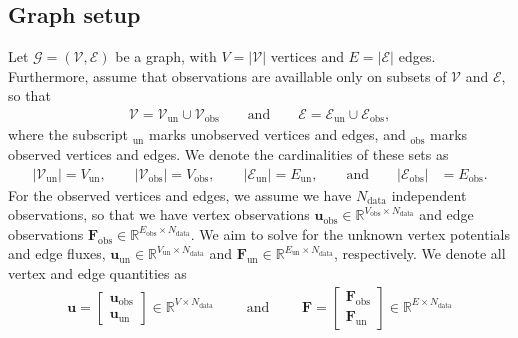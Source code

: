 \documentclass{article}
\theoremstyle{definition}
\theoremstyle{remark}
\newcommand{\R}{\mathbb{R}}
\begin{document}
\subsection{Graph setup}
Let $\mathcal{G} = (\mathcal{V},\mathcal{E})$ be a graph, with $V=\lvert \mathcal{V} \rvert$ vertices and $E=\lvert \mathcal{E} \rvert$ edges. Furthermore, assume that observations are availlable only on subsets of $\mathcal{V}$ and $\mathcal{E}$, so that
\begin{equation} \begin{split}
	\mathcal{V} = \mathcal{V}_\text{un} \cup \mathcal{V}_\text{obs} \qquad \text{and} \qquad
	\mathcal{E} = \mathcal{E}_\text{un} \cup \mathcal{E}_\text{obs},
\end{split} \end{equation}
where the subscript $_\text{un}$ marks unobserved vertices and edges, and $_\text{obs}$ marks observed vertices and edges. 
We denote the cardinalities of these sets as
\begin{equation} \begin{split} 
	\lvert \mathcal{V}_\text{un} \rvert = V_\text{un}, \qquad
	\lvert \mathcal{V}_\text{obs} \rvert = V_\text{obs}, \qquad
	\lvert \mathcal{E}_\text{un} \rvert = E_\text{un}, \qquad \text{and} \qquad
	\lvert \mathcal{E}_\text{obs} \rvert &= E_\text{obs}.
\end{split} \end{equation}
For the observed vertices and edges, we assume we have $N_\text{data}$ independent observations, so that we have vertex observations $\mathbf{u}_\text{obs} \in \R^{  V_\text{obs} \times 
 N_\text{data} }$ and edge observations $\mathbf{F}_\text{obs} \in \R^{ E_\text{obs} \times N_\text{data} }$. We aim to solve for the unknown vertex potentials and edge fluxes, $\mathbf{u}_\text{un} \in \R^{V_\text{un}\times  N_\text{data}   }$ and $\mathbf{F}_\text{un} \in \R^{ E_\text{un} \times N_\text{data} }$, respectively. We denote all vertex and edge quantities as
\begin{equation} \begin{split}
	\mathbf{u} = \begin{bmatrix} \mathbf{u}_\text{obs}  \\ \mathbf{u}_\text{un} \end{bmatrix} \in \R^{V \times N_\text{data}   } \qquad \text{ and } \qquad
	\mathbf{F} = \begin{bmatrix} \mathbf{F}_\text{obs} \\ \mathbf{F}_\text{un} \end{bmatrix} \in \R^{E \times N_\text{data} } 
\end{split} \end{equation}
\end{document}
